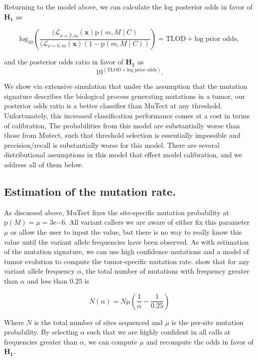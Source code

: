 \documentclass[a4,center,fleqn]{NAR}
\begin{document}
Returning to the model above, we can calculate the log posterior odds in favor of $\mathbf{H_1}$ as

$$
  \textrm{log}_{10} \left(\frac{(\mathcal{L}_{\nu=\hat{f},m}(\mathbf{x})\mathrm{p}(m,M \mid C)}{(\mathcal{L}_{\nu=0,m}(\mathbf{x})(1-\mathrm{p}(m,M \mid C))} \right) = \textrm{TLOD} + \textrm{log prior odds},
$$

and the posterior odds ratio in favor of $\mathbf{H_1}$ as
$$
10^{(\textrm{TLOD} + \textrm{log prior odds})}.
$$

We show via extensive simulation that under the assumption that the mutation signature describes the biological process generating mutations in a tumor, our posterior odds ratio is a better classifier than MuTect at any threshold.
Unfortunately, this increased classification performance comes at a cost in terms of calibration, The probabilities from this model are substantially worse than those from Mutect, such that threshold selection is essentially impossible and precision/recall is substantially worse for this model.
There are several distributional assumptions in this model that effect model calibration, and we address all of them below.

\subsection{Estimation of the mutation rate.}

As discussed above, MuTect fixes the site-specific mutation probability at $\mathrm{p}(M)= \mu = 3\mathrm{e}{-6}$.
All variant callers we are aware of either fix this parameter $\mu$ or allow the user to input the value, but there is no way to really know this value until the variant allele frequencies have been observed.
As with estimation of the mutation signature, we can use high confidence mutations and a model of tumor evolution to compute the tumor-specific mutation rate.
\citet{Bozic2016} show that for any variant allele frequency $\alpha$, the total number of mutations with frequency greater than $\alpha$ and less than $0.25$ is

$$
N(\alpha) = N\mu \left( \frac{1}{\alpha} - \frac{1}{0.25} \right)
$$

Where $N$ is the total number of sites sequenced and $\mu$ is the per-site mutation probability.
By selecting $\alpha$ such that we are highly confident in all calls at frequencies greater than $\alpha$, we can compute $\mu$ and recompute the odds in favor of $\mathbf{H_1}$.
\end{document}
